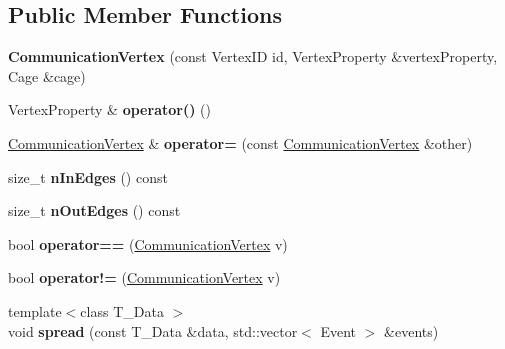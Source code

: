 \subsection*{Public Member Functions}
\begin{DoxyCompactItemize}
\item 
\hypertarget{structCommunicationVertex_a602ec19bb4de0a4c371f1b6b5cb2509c}{}{\bfseries Communication\+Vertex} (const Vertex\+I\+D id, Vertex\+Property \&vertex\+Property, Cage \&cage)\label{structCommunicationVertex_a602ec19bb4de0a4c371f1b6b5cb2509c}

\item 
\hypertarget{structCommunicationVertex_a3b5269b4cb72e697e40f0cbf69376f44}{}Vertex\+Property \& {\bfseries operator()} ()\label{structCommunicationVertex_a3b5269b4cb72e697e40f0cbf69376f44}

\item 
\hypertarget{structCommunicationVertex_a9e9331af039f9a5c0ecfb80b3f1c2c8c}{}\hyperlink{structCommunicationVertex}{Communication\+Vertex} \& {\bfseries operator=} (const \hyperlink{structCommunicationVertex}{Communication\+Vertex} \&other)\label{structCommunicationVertex_a9e9331af039f9a5c0ecfb80b3f1c2c8c}

\item 
\hypertarget{structCommunicationVertex_aa50dd2eb08041e5f374742acf499af57}{}size\+\_\+t {\bfseries n\+In\+Edges} () const \label{structCommunicationVertex_aa50dd2eb08041e5f374742acf499af57}

\item 
\hypertarget{structCommunicationVertex_a65e3d6a8799c094eabd3617d49556b67}{}size\+\_\+t {\bfseries n\+Out\+Edges} () const \label{structCommunicationVertex_a65e3d6a8799c094eabd3617d49556b67}

\item 
\hypertarget{structCommunicationVertex_aa21714107ee07da908341597bde26ac1}{}bool {\bfseries operator==} (\hyperlink{structCommunicationVertex}{Communication\+Vertex} v)\label{structCommunicationVertex_aa21714107ee07da908341597bde26ac1}

\item 
\hypertarget{structCommunicationVertex_a689c94044589d9c2574ebcbd3d5e615f}{}bool {\bfseries operator!=} (\hyperlink{structCommunicationVertex}{Communication\+Vertex} v)\label{structCommunicationVertex_a689c94044589d9c2574ebcbd3d5e615f}

\item 
\hypertarget{structCommunicationVertex_a9e7e8ac4d56e06d84e527672c964111a}{}{\footnotesize template$<$class T\+\_\+\+Data $>$ }\\void {\bfseries spread} (const T\+\_\+\+Data \&data, std\+::vector$<$ Event $>$ \&events)\label{structCommunicationVertex_a9e7e8ac4d56e06d84e527672c964111a}


\end{DoxyCompactItemize}
